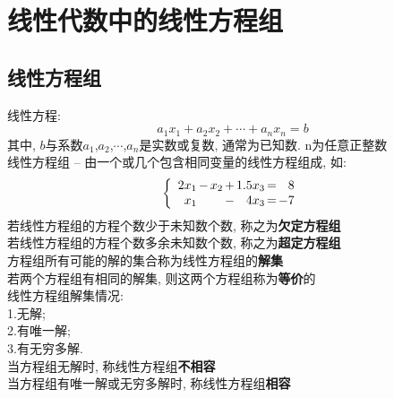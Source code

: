 \chapter{线性代数中的线性方程组}
\section{线性方程组}
线性方程:
	\[ a_{1}x_{1}+a_{2}x_{2}+\cdots +a_{n}x_{n}=b \]
其中, $b$与系数$a_{1}$,$a_{2}$,$\cdots$,$a_{n}$是实数或复数, 通常为已知数. n为任意正整数\\[2ex]

线性方程组 -- 由一个或几个包含相同变量的线性方程组成, 如:
\[\left\{\begin{array}{r@{\hspace{1.5pt}}l@{\hspace{1.5pt}}r@{\hspace{1.5pt}}l@{\hspace{1.5pt}}r@{\hspace{1.5pt}}l@{\hspace{1.5pt}}r}
	2x_1 & - & x_2 & + & 1.5x_3 & = & 8\\
	x_1  &   &     & - & 4x_3   & = & -7		
\end{array}\right.\]
若线性方程组的方程个数少于未知数个数, 称之为\textbf{欠定方程组}\\
若线性方程组的方程个数多余未知数个数, 称之为\textbf{超定方程组}\\
方程组所有可能的解的集合称为线性方程组的\textbf{解集}\\
若两个方程组有相同的解集, 则这两个方程组称为\textbf{等价}的\\[2ex]

线性方程组解集情况:\\
1.无解;\\
2.有唯一解;\\
3.有无穷多解.\\[1ex]
当方程组无解时, 称线性方程组\textbf{不相容}\\
当方程组有唯一解或无穷多解时, 称线性方程组\textbf{相容}\\[2ex]

